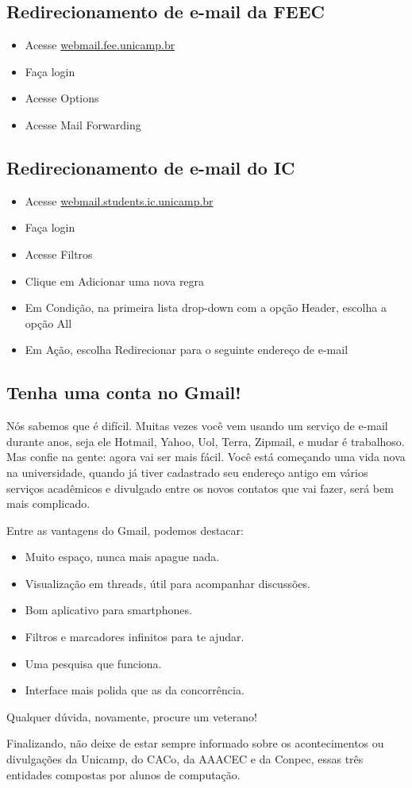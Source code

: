 \subsection{Redirecionamento de e-mail da FEEC}

\begin{itemize}
\item  Acesse \url{webmail.fee.unicamp.br}
\item  Faça login
\item  Acesse Options
\item  Acesse Mail Forwarding
\end{itemize}

\subsection{Redirecionamento de e-mail do IC}

\begin{itemize}
\item  Acesse \url{webmail.students.ic.unicamp.br}
\item  Faça login
\item  Acesse Filtros
\item  Clique em Adicionar uma nova regra
\item  Em Condição, na primeira lista drop-down com a opção Header, escolha a opção All
\item  Em Ação, escolha Redirecionar para o seguinte endereço de e-mail
\end{itemize}

\subsection{Tenha uma conta no Gmail!}

Nós sabemos que é difícil. Muitas vezes você vem usando um serviço de e-mail
durante anos, seja ele Hotmail, Yahoo, Uol, Terra, Zipmail, e mudar é trabalhoso.
Mas confie na gente: agora vai ser mais fácil. Você está começando uma
vida nova na universidade, quando já tiver cadastrado seu endereço antigo
em vários serviços acadêmicos e divulgado entre os novos contatos que vai fazer,
será bem mais complicado.

Entre as vantagens do Gmail, podemos destacar:

\begin{itemize}
\item Muito espaço, nunca mais apague nada.
\item Visualização em threads, útil para acompanhar discussões.
\item Bom aplicativo para smartphones.
\item Filtros e marcadores infinitos para te ajudar.
\item Uma pesquisa que funciona.
\item Interface mais polida que as da concorrência.
\end{itemize}

Qualquer dúvida, novamente, procure um veterano!

Finalizando, não deixe de estar sempre informado sobre os acontecimentos ou
divulgações da Unicamp, do CACo, da AAACEC e da Conpec, essas três entidades
compostas por alunos de computação.
